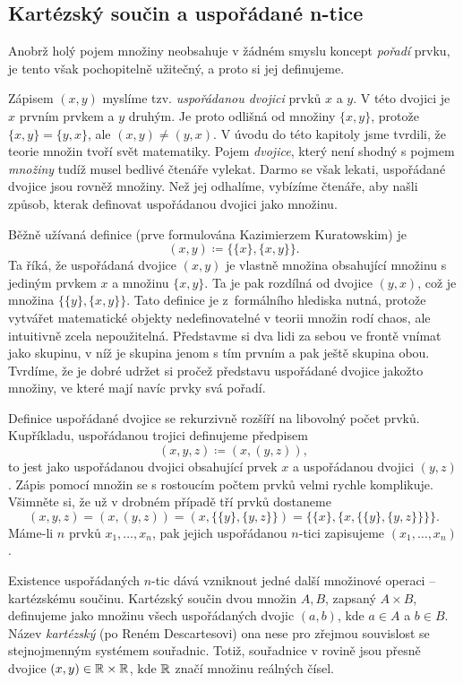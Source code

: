 \subsection{Kartézský součin a uspořádané n-tice}
\label{ssec:kartezsky-soucin-a-usporadane-n-tice}

Anobrž holý pojem množiny neobsahuje v žádném smyslu koncept \emph{pořadí}
prvku, je tento však pochopitelně užitečný, a proto si jej definujeme.

Zápisem $(x,y)$ myslíme tzv. \emph{uspořádanou dvojici} prvků $x$ a $y$. V této
dvojici je $x$ prvním prvkem a $y$ druhým. Je proto odlišná od množiny
$\{x,y\}$, protože $\{x,y\} = \{y,x\}$, ale $(x,y) \neq (y,x)$. V úvodu do této
kapitoly jsme tvrdili, že teorie množin tvoří svět matematiky. Pojem
\emph{dvojice}, který není shodný s pojmem \emph{množiny} tudíž musel bedlivé
čtenáře vylekat. Darmo se však lekati, uspořádané dvojice jsou rovněž množiny.
Než jej odhalíme, vybízíme čtenáře, aby našli způsob, kterak definovat
uspořádanou dvojici jako množinu.

Běžně užívaná definice (prve formulována Kazimierzem Kuratowskim) je
\[
 (x,y) \coloneqq \{\{x\},\{x,y\}\}.
\]
Ta říká, že uspořádaná dvojice $(x,y)$ je vlastně množina obsahující množinu s
jediným prvkem $x$ a množinu $\{x,y\}$. Ta je pak rozdílná od dvojice $(y,x)$,
což je množina $\{\{y\},\{x,y\}\}$. Tato definice je z~formálního hlediska
nutná, protože vytvářet matematické objekty nedefinovatelné v teorii množin rodí
chaos, ale intuitivně zcela nepoužitelná. Představme si dva lidi za sebou ve
frontě vnímat jako skupinu, v níž je skupina jenom s tím prvním a pak ještě
skupina obou. Tvrdíme, že je dobré udržet si pročež představu uspořádané dvojice
jakožto množiny, ve které mají navíc prvky svá pořadí.

Definice uspořádané dvojice se rekurzivně rozšíří na libovolný počet prvků.
Kupříkladu, uspořádanou trojici definujeme předpisem
\[
 (x,y,z) \coloneqq (x,(y,z)),
\]
to jest jako uspořádanou dvojici obsahující prvek $x$ a uspořádanou dvojici
$(y,z)$. Zápis pomocí množin se s rostoucím počtem prvků velmi rychle
komplikuje. Všimněte si, že už v drobném případě tří prvků dostaneme
\[
 (x,y,z) = (x,(y,z)) = (x,\{\{y\},\{y,z\}\}) = \{\{x\},\{x,
 \{\{y\},\{y,z\}\}\}\}.
\]
Máme-li $n$ prvků $x_1,\ldots,x_n$, pak jejich uspořádanou $n$-tici zapisujeme
$(x_1,\ldots,x_n)$.

Existence uspořádaných $n$-tic dává vzniknout jedné další množinové operaci --
kartézskému součinu. Kartézský součin dvou množin $A,B$, zapsaný $A \times B$,
definujeme jako množinu všech uspořádaných dvojic $(a,b)$, kde $a \in A$ a $b
\in B$. Název \emph{kartézský} (po Reném Descartesovi) ona nese pro zřejmou
souvislost se stejnojmenným systémem souřadnic. Totiž, souřadnice v rovině jsou
přesně dvojice $(x,y) \in \mathbb{R} \times \mathbb{R}$, kde $\mathbb{R}$ značí množinu reálných čísel.

